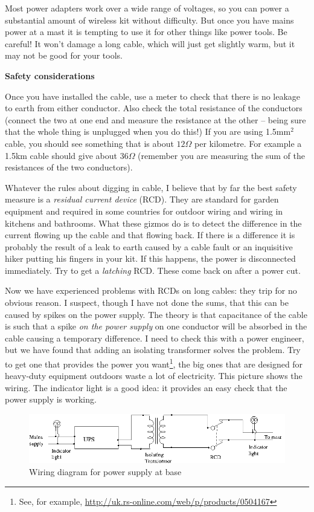 \documentclass{article}
\begin{document}
{\small

}

Most power adapters work over a wide range of voltages, so you can
power a substantial amount of wireless kit without difficulty.  But
once you have mains power at a mast it is tempting to use it for other
things like power tools.  Be careful!  It won't damage a long cable, which
will just get slightly warm, but it may not be good for your tools.

{\bf Safety considerations}

Once you have installed the cable, use a meter to check that
there is no leakage to earth from either conductor.  Also check the
total resistance of the conductors (connect the two at one end and
measure the resistance at the other -- being sure that the whole thing
is unplugged when you do this!)  If you are using 1.5mm$^2$ cable, you
should see something that is about $12\Omega$ per kilometre.  For
example a 1.5km cable should give about $36\Omega$ (remember you are
measuring the sum of the resistances of the two conductors).

Whatever the rules about digging in cable, I believe that by far the
best safety measure is a {\em residual
current device} (RCD). They are standard for garden equipment and
required in some countries for outdoor wiring and wiring in kitchens
and bathrooms.
What these gizmos do is to detect the
difference in the current flowing up the cable and that flowing back.
If there is a difference it is probably the result of a leak to earth
caused by a cable fault or an inquisitive hiker putting his fingers in
your kit. If this happens, the power is disconnected immediately.
Try to get a {\em latching} RCD.  These come back on after a
power cut.

Now we have experienced problems with RCDs on long cables: they trip
for no obvious reason.  I suspect, though I have not done the sums,
that this can be caused by spikes on the power supply.  The theory is
that 
capacitance of the cable is such that a spike {\em on the power supply} on one conductor will be
absorbed in the cable causing a temporary difference.  I need to check
this with a power engineer, but we have found that adding an isolating transformer solves
the problem.  Try to get one that provides the power you
want\footnote{See, for example, \url{http://uk.rs-online.com/web/p/products/0504167}}, the big
ones that are designed for  heavy-duty equipment outdoors waste a lot of
electricity. This picture shows the wiring.  The indicator light is a
good idea: it provides an easy check that the power supply is working.
\begin{figure}
\begin{center}
\includegraphics[scale=0.7]{isolating}
\end{center}
\caption{Wiring diagram for power supply at base}
\end{figure}
\end{document}
